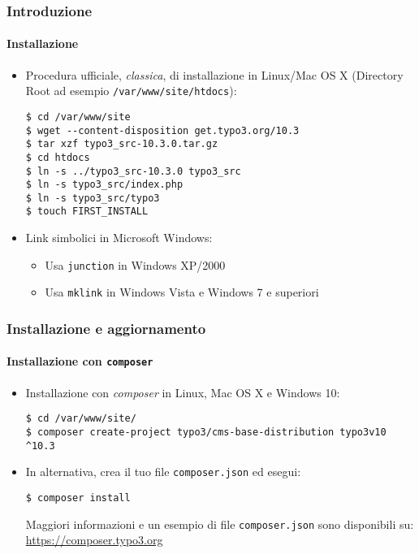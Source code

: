 
\begin{frame}[fragile]
	\frametitle{Introduzione}
	\framesubtitle{Installazione}

	\begin{itemize}
		\item Procedura ufficiale, \textit{classica}, di installazione in Linux/Mac OS X\newline
			(Directory Root ad esempio \texttt{/var/www/site/htdocs}):
\begin{lstlisting}
$ cd /var/www/site
$ wget --content-disposition get.typo3.org/10.3
$ tar xzf typo3_src-10.3.0.tar.gz
$ cd htdocs
$ ln -s ../typo3_src-10.3.0 typo3_src
$ ln -s typo3_src/index.php
$ ln -s typo3_src/typo3
$ touch FIRST_INSTALL
\end{lstlisting}

		\item Link simbolici in Microsoft Windows:

			\begin{itemize}
				\item Usa \texttt{junction} in Windows XP/2000
				\item Usa \texttt{mklink} in Windows Vista e Windows 7 e superiori
			\end{itemize}

	\end{itemize}
\end{frame}


\begin{frame}[fragile]
	\frametitle{Installazione e aggiornamento}
	\framesubtitle{Installazione con \texttt{composer}}

	\begin{itemize}
		\item Installazione con \textit{composer} in Linux, Mac OS X e Windows 10:
\begin{lstlisting}
$ cd /var/www/site/
$ composer create-project typo3/cms-base-distribution typo3v10 ^10.3
\end{lstlisting}

		\item In alternativa, crea il tuo file \texttt{composer.json} ed esegui:
\begin{lstlisting}
$ composer install
\end{lstlisting}

			Maggiori informazioni e un esempio di file \texttt{composer.json} sono disponibili su:\newline
			\smaller
				\href{https://composer.typo3.org}{https://composer.typo3.org}
			\normalsize

	\end{itemize}
\end{frame}

